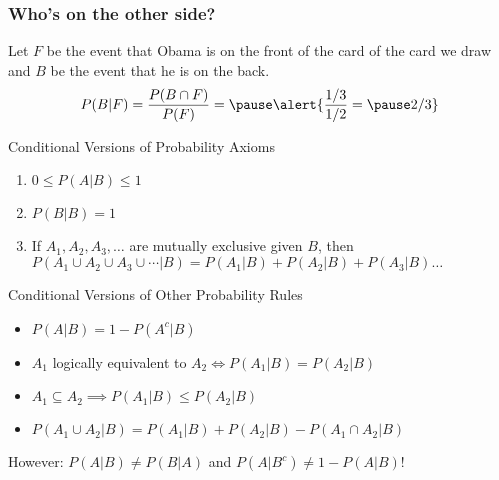 \begin{frame}
\frametitle{Who's on the other side?}
Let $F$ be the event that Obama is on the front of the card of the card we draw and $B$ be the event that he is on the back.
$$P(B|F) = \frac{P(B\cap F)}{P(F)} = \pause \alert{\frac{1/3}{1/2}= \pause 2/3}$$

\end{frame}

\begin{frame}
  \small
  \begin{block}{Conditional Versions of Probability Axioms}
    \begin{enumerate}
      \item $0 \leq P(A|B) \leq 1$
      \item $P(B|B) = 1$
      \item If $A_1, A_2, A_3, \dots$ are mutually exclusive given $B$, then $P(A_1\cup A_2\cup A_3 \cup \cdots|B) = P(A_1|B) + P(A_2|B) + P(A_3|B)\dots$
    \end{enumerate}
  \end{block}

  \begin{block}{Conditional Versions of Other Probability Rules}
    \begin{itemize}
      \item $P(A|B) = 1 - P(A^c|B)$
      \item $A_1$ logically equivalent to $A_2 \iff P(A_1|B) = P(A_2|B)$
      \item $A_1 \subseteq A_2 \implies P(A_1|B) \leq P(A_2|B)$  
      \item $P(A_1 \cup A_2 | B) = P(A_1|B) + P(A_2|B) - P(A_1 \cap A_2|B)$
    \end{itemize}
  \end{block}


    \alert{However: $P(A|B) \neq P(B|A)$ and $P(A|B^c) \neq 1 - P(A|B)$!}
  
\end{frame}

